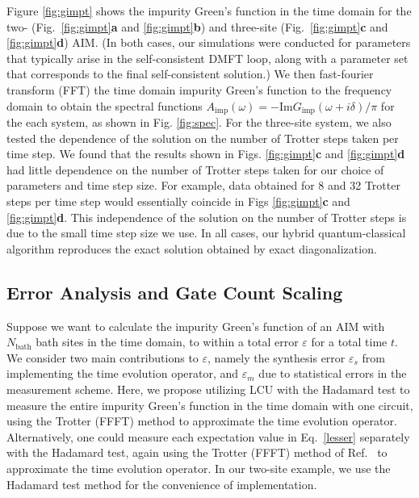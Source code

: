 \documentclass[aip,reprint,table,xcdraw,usenames,dvipsnames]{revtex4-1}
\begin{document}
Figure \ref{fig:gimpt} shows the impurity Green's function in the time 
domain for the two- (Fig.~\ref{fig:gimpt}{\bf a} and \ref{fig:gimpt}{\bf b}) and three-site (Fig.~\ref{fig:gimpt}{\bf c} and \ref{fig:gimpt}{\bf d}) AIM. 
(In both cases, our simulations were conducted for parameters that typically arise in the self-consistent DMFT loop, along with a parameter set that corresponds to the final self-consistent solution.) We then fast-fourier transform (FFT) the time domain impurity Green's function to the frequency domain to obtain the spectral functions $A_\mathrm{imp}(\omega)=-\mathrm{Im}G_\mathrm{imp}(\omega + i\delta)/\pi$ for 
the each system, as shown in Fig. \ref{fig:spec}. For the three-site system, we also tested the dependence of the solution on the number of Trotter steps taken per time step. We found that the results shown in Figs. \ref{fig:gimpt}{\bf c} and \ref{fig:gimpt}{\bf d} had little dependence on the number of Trotter steps taken for our choice of parameters and time step size. For example, data obtained for 8 and 32 Trotter steps per time step would  essentially coincide in Figs \ref{fig:gimpt}{\bf c} and \ref{fig:gimpt}{\bf d}. This independence of the solution on the number of Trotter steps is due to the small time step size we use. In all cases, our hybrid quantum-classical algorithm reproduces the exact solution obtained by exact diagonalization. 
\\

\subsection*{Error Analysis and Gate Count Scaling} \label{sec:gatecount}
Suppose we want to calculate the impurity Green's 
function of an AIM with $N_{\text{bath}}$ bath sites in the time domain, to 
within a total error
$\varepsilon$ for a total time $t$. We consider two main 
contributions to 
$\varepsilon$, namely the synthesis error $\varepsilon_s$
from implementing the time evolution operator, and 
$\varepsilon_m$ due to statistical errors in the 
measurement scheme. Here, we propose utilizing 
LCU with the Hadamard test to measure the entire 
impurity Green's function 
in the time domain with one circuit, using the Trotter (FFFT) 
method to approximate the time evolution operator. 
Alternatively, one could 
measure each expectation value in Eq.~\eqref{lesser}
separately with the Hadamard test, again using
the Trotter (FFFT) method of Ref.~
 to approximate the time 
evolution operator. In our two-site example, we use
the Hadamard test method for the convenience of implementation.
\end{document}
